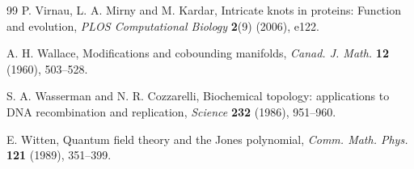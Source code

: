 \documentclass[a4paper, reqno, 12pt]{amsart}
\theoremstyle{plain}
\theoremstyle{definition}
\begin{document}
\begin{thebibliography}{99}
 {\sc P. Virnau, L. A. Mirny and M. Kardar}, Intricate knots in proteins: Function and evolution, \emph{PLOS Computational Biology} \textbf{2}(9) (2006), e122.

{\sc A. H. Wallace},
Modifications and cobounding manifolds,
{\it Canad. J. Math.} {\bf 12} (1960), 503--528.

 {\sc  S. A. Wasserman and N. R. Cozzarelli}, Biochemical topology: applications to DNA recombination and replication, \emph{Science} \textbf{232} (1986), 951--960.

{\sc E. Witten},
Quantum field theory and the Jones polynomial,
{\it Comm. Math. Phys.} {\bf 121} (1989), 351--399.


\end{thebibliography}
\end{document}
